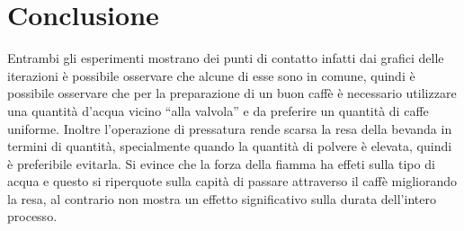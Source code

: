 \chapter{Conclusione}
Entrambi gli esperimenti mostrano dei punti di contatto infatti dai grafici delle iterazioni è possibile osservare che alcune di esse sono in comune, quindi è possibile osservare che per la preparazione di un buon caffè è necessario utilizzare una quantità d'acqua vicino “alla valvola” e da preferire un quantità di caffe uniforme. Inoltre l'operazione di pressatura rende scarsa la resa della bevanda in termini di quantità, specialmente quando la quantità di polvere è elevata, quindi è preferibile evitarla.
 Si evince che la forza della fiamma ha effeti sulla tipo di acqua e questo si riperquote sulla capità di passare attraverso il caffè migliorando la resa, al contrario non mostra un effetto significativo sulla durata dell'intero processo.
